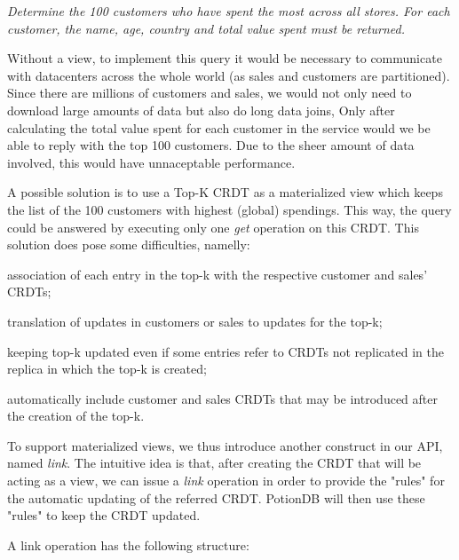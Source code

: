 \documentclass{vldb}
\begin{document}
\emph{Determine the 100 customers who have spent the most across all stores. For each customer, the name, age, country and total value spent must be returned.}

Without a view, to implement this query it would be necessary to communicate with datacenters across the whole world (as sales and customers are partitioned). 
Since there are millions of customers and sales, we would not only need to download large amounts of data but also do long data joins,
Only after calculating the total value spent for each customer in the service would we be able to reply with the top 100 customers.
Due to the sheer amount of data involved, this would have unnaceptable performance.

A possible solution is to use a Top-K CRDT %
as a materialized view which keeps the list of the 100 customers with highest (global) spendings.
This way, the query could be answered by executing only one \emph{get} operation on this CRDT.
This solution does pose some difficulties, namelly: 
\begin{enumerate*}[label=(\roman*)]
	\item association of each entry in the top-k with the respective customer and sales' CRDTs;
	\item translation of updates in customers or sales to updates for the top-k;
	\item keeping top-k updated even if some entries refer to CRDTs not replicated in the replica in which the top-k is created;
	\item automatically include customer and sales CRDTs that may be introduced after the creation of the top-k.
\end{enumerate*}

To support materialized views, we thus introduce another construct in our API, named \emph{link}.
The intuitive idea is that, after creating the CRDT that will be acting as a view, we can issue a \emph{link} operation in order to provide the "rules" for the automatic updating of the referred CRDT.
PotionDB will then use these "rules" to keep the CRDT updated.

A link operation has the following structure:

\end{document}

